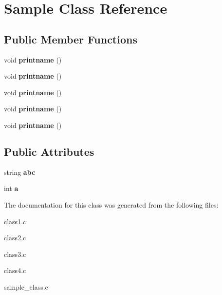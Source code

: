 \hypertarget{classSample}{}\section{Sample Class Reference}
\label{classSample}
\subsection*{Public Member Functions}
\begin{DoxyCompactItemize}
\item 
\mbox{\label{classSample_a3c0dd6e96d2ec9f80334d99cec01ce72}} 
void {\bfseries printname} ()
\item 
\mbox{\label{classSample_a3c0dd6e96d2ec9f80334d99cec01ce72}} 
void {\bfseries printname} ()
\item 
\mbox{\label{classSample_a3c0dd6e96d2ec9f80334d99cec01ce72}} 
void {\bfseries printname} ()
\item 
\mbox{\label{classSample_a3c0dd6e96d2ec9f80334d99cec01ce72}} 
void {\bfseries printname} ()
\item 
\mbox{\label{classSample_a3c0dd6e96d2ec9f80334d99cec01ce72}} 
void {\bfseries printname} ()
\end{DoxyCompactItemize}
\subsection*{Public Attributes}
\begin{DoxyCompactItemize}
\item 
\mbox{\label{classSample_a0a62a725cfb6a3763e58a881b2714e09}} 
string {\bfseries abc}
\item 
\mbox{\label{classSample_a987b741b7ae1230433c55ff4bc8485a7}} 
int {\bfseries a}
\end{DoxyCompactItemize}


The documentation for this class was generated from the following files\+:\begin{DoxyCompactItemize}
\item 
class1.\+c\item 
class2.\+c\item 
class3.\+c\item 
class4.\+c\item 
sample\+\_\+class.\+c\end{DoxyCompactItemize}

